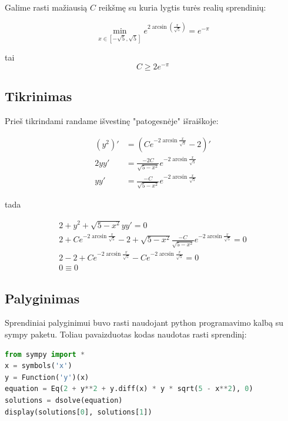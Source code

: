 \documentclass[11pt]{article}
\begin{document}
Galime rasti mažiausią $C$ reikšmę su kuria lygtis turės realių sprendinių:

\begin{equation}
\min_{x\in[-\sqrt{5}, \sqrt{5}]} e^{2\arcsin(\frac{x}{\sqrt 5})} = e^{-\pi}
\end{equation}

tai $$C\geqslant2e^{-\pi}$$


\newpage
\subsection{Tikrinimas}

Prieš tikrindami randame išvestinę "patogesnėje" išraiškoje:

\begin{equation}
    \begin{split}
        (y^2)'&=(Ce^{-2\arcsin{\frac{x}{\sqrt{5}}}} - 2)' \\
        2yy'&=\frac{-2C}{\sqrt{5-x^2}}e^{-2\arcsin{\frac{x}{\sqrt{5}}}}\\
        yy'&=\frac{-C}{\sqrt{5-x^2}}e^{-2\arcsin{\frac{x}{\sqrt{5}}}}
    \end{split}
\end{equation}

tada

\begin{equation}
    \begin{split}
        2+y^2+\sqrt{5-x^2}yy'=0\\
        2+Ce^{-2\arcsin{\frac{x}{\sqrt{5}}}} - 2+\sqrt{5-x^2}\frac{-C}{\sqrt{5-x^2}}e^{-2\arcsin{\frac{x}{\sqrt{5}}}}=0\\
        2-2+Ce^{-2\arcsin{\frac{x}{\sqrt{5}}}}-Ce^{-2\arcsin{\frac{x}{\sqrt{5}}}}=0\\
        0\equiv0
    \end{split}
\end{equation}

\subsection{Palyginimas}

Sprendiniai palyginimui buvo rasti naudojant 
python programavimo kalbą su sympy paketu. 
Toliau pavaizduotas kodas naudotas rasti sprendinį:

\begin{lstlisting}[language=Python]
from sympy import *
x = symbols('x')
y = Function('y')(x)
equation = Eq(2 + y**2 + y.diff(x) * y * sqrt(5 - x**2), 0)
solutions = dsolve(equation)
display(solutions[0], solutions[1])
\end{lstlisting}
\end{document}
